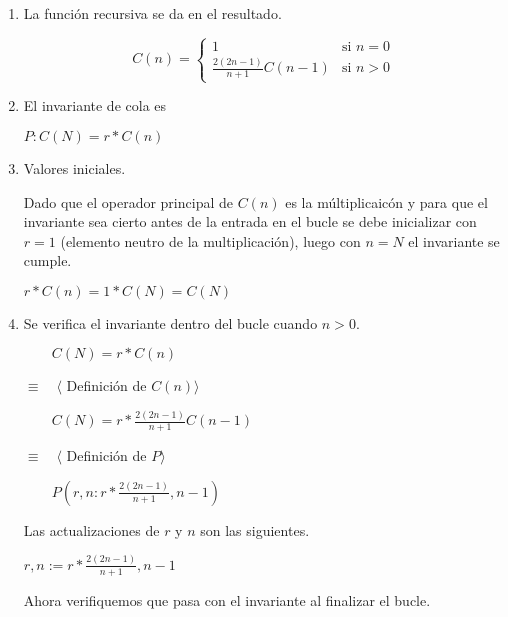 \documentclass[hidelinks]{article}
\begin{document}
\begin{enumerate}
	\item La función recursiva se da en el resultado.\par
	      \begin{equation}
		      C(n) =
		      \begin{cases}
			      1                               & \text{si } n = 0 \\
			      \frac{2(2n - 1)}{n + 1}C(n - 1) & \text{si } n > 0
		      \end{cases}
	      \end{equation} \par
	\item El invariante de cola es
	      \begin{center}
		      $P: C(N) = r * C(n)$\par
	      \end{center}
	\item Valores iniciales.\par
	      Dado que el operador principal de $C(n)$ es la múltiplicaicón y para que el
	      invariante sea cierto antes de la entrada en el bucle se debe inicializar con
	      $r = 1$ (elemento neutro de la multiplicación), luego con $n = N$ el invariante
	      se cumple.\par
	      $r * C(n) = 1 * C(N) = C(N)$\par
	\item Se verifica el invariante dentro del bucle cuando $n > 0$.\par
	      $\qquad C(N) = r * C(n)$\par
	      $\equiv \quad \langle$ Definición de  $C(n)\rangle$\par
	      $\qquad C(N) = r * \frac{2(2n - 1)}{n + 1}C(n - 1)$\par
	      $\equiv \quad \langle$ Definición de  $P\rangle$\par
	      $\qquad P(r,n : r * \frac{2(2n - 1)}{n + 1}, n - 1)$\par

	      Las actualizaciones de $r$ y $n$ son las siguientes.\par

	      \begin{center}
		      $r, n := r * \frac{2(2n - 1)}{n + 1}, n - 1$
	      \end{center}

	      Ahora verifiquemos que pasa con el invariante al finalizar el bucle.\par


\end{enumerate}
\end{document}
